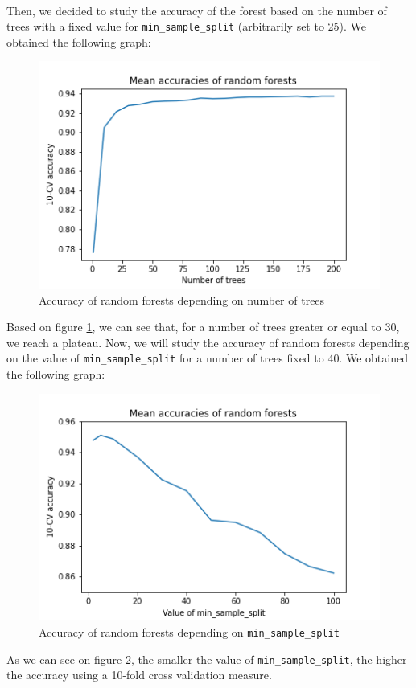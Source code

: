 \documentclass[a4paper, 11pt, oneside]{article}
\begin{document}
\paragraph{}Then, we decided to study the accuracy of the forest based on the number of trees with a fixed value for \texttt{min\_sample\_split} (arbitrarily set to 25). We obtained the following graph:
\begin{figure}[H]
\centering
\includegraphics[scale=0.4]{rf/rf_basic_accuracies.png}
\caption{Accuracy of random forests depending on number of trees}
\label{fig:rf-acc-1}
\end{figure}
Based on figure \ref{fig:rf-acc-1}, we can see that, for a number of trees greater or equal to 30, we reach a plateau. Now, we will study the accuracy of random forests depending on the value of \texttt{min\_sample\_split} for a number of trees fixed to 40. We obtained the following graph:
\begin{figure}[H]
\centering
\includegraphics[scale=0.4]{rf/rf_40_accuracies.png}
\caption{Accuracy of random forests depending on \texttt{min\_sample\_split}}
\label{fig:rf-acc-2}
\end{figure}
As we can see on figure \ref{fig:rf-acc-2}, the smaller the value of \texttt{min\_sample\_split}, the higher the accuracy using a 10-fold cross validation measure.
\end{document}
